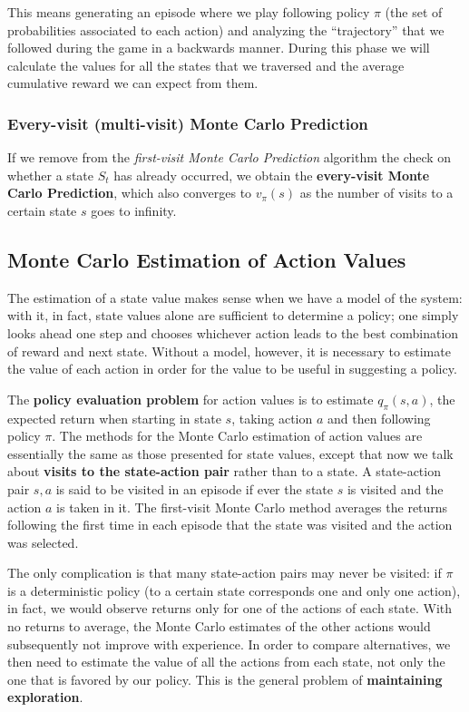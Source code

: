 This means generating an episode where we play following policy $\pi$ (the set of probabilities associated to each action) and analyzing the ``trajectory'' that we followed during the game in a backwards manner. During this phase we will calculate the values for all the states that we traversed and the average cumulative reward we can expect from them.

\subsubsection{Every-visit (multi-visit) Monte Carlo Prediction}
If we remove from the \textit{first-visit Monte Carlo Prediction} algorithm the check on whether a state $S_t$ has already occurred, we obtain the \textbf{every-visit Monte Carlo Prediction}, which also converges to $v_\pi (s)$ as the number of visits to a certain state $s$ goes to infinity.

\subsection{Monte Carlo Estimation of Action Values}
The estimation of a state value makes sense when we have a model of the system: with it, in fact, state values alone are sufficient to determine a policy; one simply looks ahead one step and chooses whichever action leads to the best combination of reward and next state. Without a model, however, it is necessary to estimate the value of each action in order for the value to be useful in suggesting a policy. 

The \textbf{policy evaluation problem} for action values is to estimate $q_\pi (s,a)$, the expected return when starting in state $s$, taking action $a$ and then following policy $\pi$. The methods for the Monte Carlo estimation of action values are essentially the same as those presented for state values, except that now we talk about \textbf{visits to the state-action pair} rather than to a state. A state-action pair $s,a$ is said to be visited in an episode if ever the state $s$ is visited and the action $a$ is taken in it. The first-visit Monte Carlo method averages the returns following the first time in each episode that the state was visited and the action was selected.

The only complication is that many state-action pairs may never be visited: if $\pi$ is a deterministic policy (to a certain state corresponds one and only one action), in fact, we would observe returns only for one of the actions of each state. With no returns to average, the Monte Carlo estimates of the other actions would subsequently not improve with experience. In order to compare alternatives, we then need to estimate the value of all the actions from each state, not only the one that is favored by our policy. This is the general problem of \textbf{maintaining exploration}.

